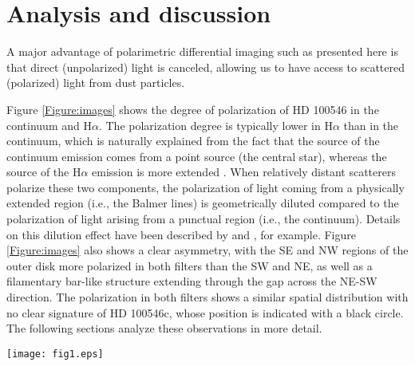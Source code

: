 \documentclass{aa}
\begin{document}
\section{Analysis and discussion}
\label{Sect:analisis}
A major advantage of polarimetric differential imaging such as presented here is that direct (unpolarized) light is canceled, allowing us to have access to scattered (polarized) light from dust particles. 

Figure \ref{Figure:images} shows the degree of polarization of HD 100546 in the continuum and H$\alpha$. The polarization degree is typically lower in H$\alpha$ than in the continuum, which is naturally explained from the fact that the source of the continuum emission comes from a point source (the central star), whereas the source of the H$\alpha$ emission is more extended \citep[accretion/wind regions; see, e.g.,][and references therein]{Mendi15b,Mendi17}. When relatively distant scatterers polarize these two components, the polarization of light coming from a physically extended region (i.e., the Balmer lines) is geometrically diluted compared to the polarization of light arising from a punctual region (i.e., the continuum). Details on this dilution effect have been described by \citet{Cassinelli87} and \citet{Trammell94}, for example. Figure \ref{Figure:images} also shows a clear asymmetry, with the SE and NW regions of the outer disk more polarized in both filters than the SW and NE, as well as a filamentary bar-like structure extending through the gap across the NE-SW direction. The polarization in both filters shows a similar spatial distribution with no clear signature of HD 100546c, whose position is indicated with a black circle. The following sections analyze these observations in more detail.

\begin{figure*}
[!hbtp]
\centering
\texttt{[image: fig1.eps]}
\caption{SPHERE/ZIMPOL images of HD 100546 in the continuum (left panel) and H$\alpha$ (right panel) filters. The same color code is used for both panels, the numbers in the right-hand legend indicating the linear polarization degree (square root scale). The positions of the central star and candidate c \citep[at a radial distance and $PA$ of $\sim$ 140 $mas$ and 130$\degr$;][]{Currie15} are indicated with a white cross and a black circle, respectively, with a size similar to the spatial resolution ($\sim$ 20 $mas$).}
\label{Figure:images}
\end{figure*}
\end{document}
